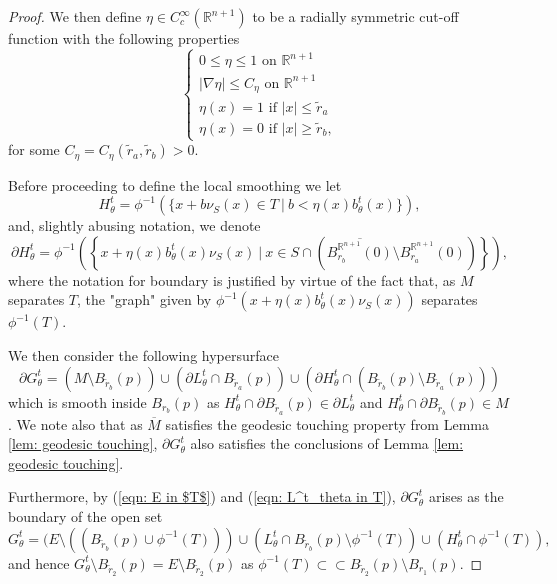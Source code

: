 \documentclass[11pt]{article}
\begin{document}
\begin{proof}
\bigskip

We then define $\eta \in C^\infty_c(\mathbb{R}^{n+1})$ to be a radially symmetric cut-off function with the following properties
\begin{equation*}
\begin{cases}
0 \leq \eta \leq 1 \text{ on } \mathbb{R}^{n+1}\\|\nabla \eta | \leq C_\eta \text{ on } \mathbb{R}^{n+1}\\
\eta(x) = 1 \text{ if } |x| \leq \tilde{r}_a \\
\eta(x) = 0 \text{ if } |x| \geq \tilde{r}_b,
\end{cases}
\end{equation*}
for some $C_\eta = C_\eta(\tilde{r}_a,\tilde{r}_b) > 0$.
\bigskip

Before proceeding to define the local smoothing we let
\begin{equation*}
    H^t_\theta = \phi^{-1}\left(\{x + b\nu_S(x) \in T \: | \: b < \eta(x)b^t_\theta(x) \}\right),
\end{equation*}
and, slightly abusing notation, we denote
\begin{equation*}
    \partial H^t_\theta = \phi^{-1}\left(\left\{ x + \eta(x)b^t_\theta(x) \nu_S(x) \: | \: x \in S \cap (\overline{B_{r_b}^{\mathbb{R}^{n+1}}(0)} \setminus B_{r_a}^{\mathbb{R}^{n+1}}(0))\right\}\right),
\end{equation*}
where the notation for boundary is justified by virtue of the fact that, as $M$ separates $T$, the "graph" given by $\phi^{-1}(x + \eta(x)b^t_\theta(x)\nu_S(x))$ separates $\phi^{-1}(T)$. 

\bigskip

We then consider the following hypersurface
\begin{equation*}
    \partial G^t_\theta = (M \setminus B_{\tilde{r}_b}(p)) \cup (\partial L^t_\theta \cap B_{\tilde{r}_a}(p)) \cup \left(\partial H^t_\theta \cap (B_{\tilde{r}_b}(p) \setminus B_{\tilde{r}_a}(p))\right)
\end{equation*}
which is smooth inside $B_{r_b}(p)$ as $H^t_\theta \cap \partial B_{\tilde{r}_a}(p) \in  \partial L^t_\theta$
and $H^t_\theta \cap \partial B_{\tilde{r}_b}(p) \in M$. We note also that as $\overline{M}$ satisfies the geodesic touching property from Lemma \ref{lem: geodesic touching},  $\partial G^t_\theta$ also satisfies the conclusions of Lemma \ref{lem: geodesic touching}.

\bigskip

Furthermore, by (\ref{eqn: E in $T$}) and (\ref{eqn: L^t_theta in T}), $\partial G^t_\theta$ arises as the boundary of the open set 
\begin{equation*}
    G^t_\theta = (E \setminus ((B_{\tilde{r}_b}(p) \cup \phi^{-1}(T)))  \cup (L^t_\theta \cap B_{\tilde{r}_b}(p) \setminus \phi^{-1}(T)) \cup (H^t_\theta \cap \phi^{-1}(T)),
\end{equation*}
and hence $G^t_\theta \setminus B_{\tilde{r}_2}(p) = E \setminus B_{\tilde{r}_2}(p)$ as $\phi^{-1}(T) \subset \subset B_{\tilde{r}_2}(p) \setminus B_{r_1}(p)$.


\end{proof}
\end{document}
